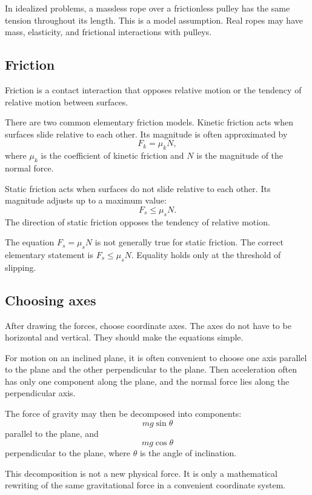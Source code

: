 In idealized problems, a massless rope over a frictionless pulley has the same tension throughout its length. This is a model assumption. Real ropes may have mass, elasticity, and frictional interactions with pulleys.

\subsection{Friction}

Friction is a contact interaction that opposes relative motion or the tendency of relative motion between surfaces.

There are two common elementary friction models. Kinetic friction acts when surfaces slide relative to each other. Its magnitude is often approximated by
\[
F_k=\mu_k N,
\]
where \(\mu_k\) is the coefficient of kinetic friction and \(N\) is the magnitude of the normal force.

Static friction acts when surfaces do not slide relative to each other. Its magnitude adjusts up to a maximum value:
\[
F_s\leq \mu_s N.
\]
The direction of static friction opposes the tendency of relative motion.

\begin{remarkbox}
The equation \(F_s=\mu_s N\) is not generally true for static friction. The correct elementary statement is \(F_s\leq \mu_s N\). Equality holds only at the threshold of slipping.
\end{remarkbox}

\subsection{Choosing axes}

After drawing the forces, choose coordinate axes. The axes do not have to be horizontal and vertical. They should make the equations simple.

For motion on an inclined plane, it is often convenient to choose one axis parallel to the plane and the other perpendicular to the plane. Then acceleration often has only one component along the plane, and the normal force lies along the perpendicular axis.

The force of gravity may then be decomposed into components:
\[
mg\sin\theta
\]
parallel to the plane, and
\[
mg\cos\theta
\]
perpendicular to the plane, where \(\theta\) is the angle of inclination.

This decomposition is not a new physical force. It is only a mathematical rewriting of the same gravitational force in a convenient coordinate system.

